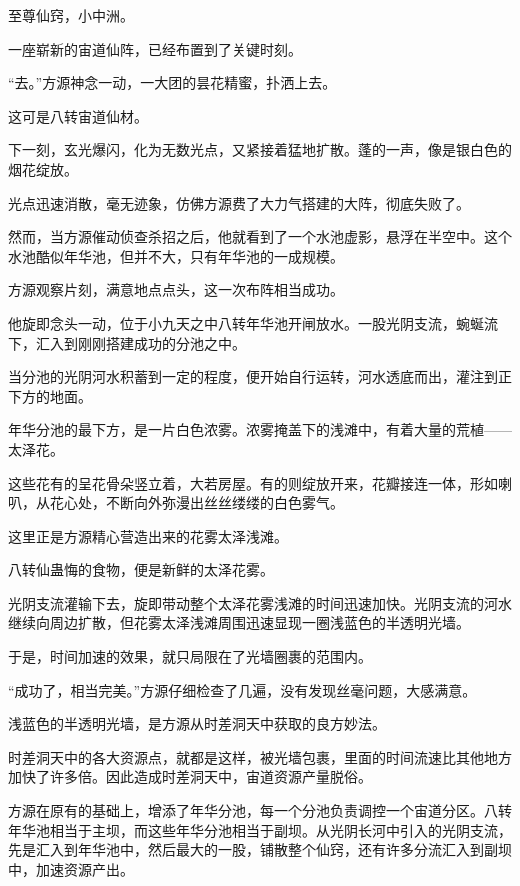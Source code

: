 
\begin{this_body}

至尊仙窍，小中洲。

一座崭新的宙道仙阵，已经布置到了关键时刻。

“去。”方源神念一动，一大团的昙花精蜜，扑洒上去。

这可是八转宙道仙材。

下一刻，玄光爆闪，化为无数光点，又紧接着猛地扩散。蓬的一声，像是银白色的烟花绽放。

光点迅速消散，毫无迹象，仿佛方源费了大力气搭建的大阵，彻底失败了。

然而，当方源催动侦查杀招之后，他就看到了一个水池虚影，悬浮在半空中。这个水池酷似年华池，但并不大，只有年华池的一成规模。

方源观察片刻，满意地点点头，这一次布阵相当成功。

他旋即念头一动，位于小九天之中八转年华池开闸放水。一股光阴支流，蜿蜒流下，汇入到刚刚搭建成功的分池之中。

当分池的光阴河水积蓄到一定的程度，便开始自行运转，河水透底而出，灌注到正下方的地面。

年华分池的最下方，是一片白色浓雾。浓雾掩盖下的浅滩中，有着大量的荒植——太泽花。

这些花有的呈花骨朵竖立着，大若房屋。有的则绽放开来，花瓣接连一体，形如喇叭，从花心处，不断向外弥漫出丝丝缕缕的白色雾气。

这里正是方源精心营造出来的花雾太泽浅滩。

八转仙蛊悔的食物，便是新鲜的太泽花雾。

光阴支流灌输下去，旋即带动整个太泽花雾浅滩的时间迅速加快。光阴支流的河水继续向周边扩散，但花雾太泽浅滩周围迅速显现一圈浅蓝色的半透明光墙。

于是，时间加速的效果，就只局限在了光墙圈裹的范围内。

“成功了，相当完美。”方源仔细检查了几遍，没有发现丝毫问题，大感满意。

浅蓝色的半透明光墙，是方源从时差洞天中获取的良方妙法。

时差洞天中的各大资源点，就都是这样，被光墙包裹，里面的时间流速比其他地方加快了许多倍。因此造成时差洞天中，宙道资源产量脱俗。

方源在原有的基础上，增添了年华分池，每一个分池负责调控一个宙道分区。八转年华池相当于主坝，而这些年华分池相当于副坝。从光阴长河中引入的光阴支流，先是汇入到年华池中，然后最大的一股，铺散整个仙窍，还有许多分流汇入到副坝中，加速资源产出。


\end{this_body}

